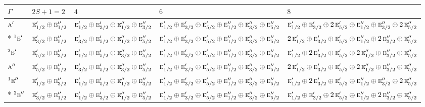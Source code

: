 \documentclass[10pt,a4paper]{article}
\numberwithin{equation}{section}
\newcommand{\irr}[1]{\text{\normalfont\scshape #1}}
\newcommand{\conjpair}[1]{{}^{#1}}
\begin{document}
{\small\setlength{\tabcolsep}{3pt}\begin{longtable}{@{}l>{\RaggedRight\arraybackslash}p{}>{\RaggedRight\arraybackslash}p{}>{\RaggedRight\arraybackslash}p{}>{\RaggedRight\arraybackslash}p{}@{}}\toprule
$\Gamma$ & $2S + 1 = 2$ & $4$ & $6$ & $8$\\\midrule\endhead
\bottomrule\endfoot\endlastfoot
$\irr{a}'$ & $\irr{e}_{1/2}'\oplus \irr{e}_{1/2}''$ & $\irr{e}_{1/2}'\oplus \irr{e}_{3/2}'\oplus \irr{e}_{1/2}''\oplus \irr{e}_{3/2}''$ & $\irr{e}_{1/2}'\oplus \irr{e}_{3/2}'\oplus \irr{e}_{5/2}'\oplus \irr{e}_{1/2}''\oplus \irr{e}_{3/2}''\oplus \irr{e}_{5/2}''$ & $\irr{e}_{1/2}'\oplus \irr{e}_{3/2}'\oplus 2\,\irr{e}_{5/2}'\oplus \irr{e}_{1/2}''\oplus \irr{e}_{3/2}''\oplus 2\,\irr{e}_{5/2}''$\\*
$\conjpair{1}\irr{e}'$ & $\irr{e}_{3/2}'\oplus \irr{e}_{5/2}''$ & $\irr{e}_{3/2}'\oplus \irr{e}_{5/2}'\oplus \irr{e}_{1/2}''\oplus \irr{e}_{5/2}''$ & $\irr{e}_{1/2}'\oplus \irr{e}_{3/2}'\oplus \irr{e}_{5/2}'\oplus \irr{e}_{1/2}''\oplus \irr{e}_{3/2}''\oplus \irr{e}_{5/2}''$ & $2\,\irr{e}_{1/2}'\oplus \irr{e}_{3/2}'\oplus \irr{e}_{5/2}'\oplus \irr{e}_{1/2}''\oplus 2\,\irr{e}_{3/2}''\oplus \irr{e}_{5/2}''$\\
$\conjpair{2}\irr{e}'$ & $\irr{e}_{5/2}'\oplus \irr{e}_{3/2}''$ & $\irr{e}_{1/2}'\oplus \irr{e}_{5/2}'\oplus \irr{e}_{3/2}''\oplus \irr{e}_{5/2}''$ & $\irr{e}_{1/2}'\oplus \irr{e}_{3/2}'\oplus \irr{e}_{5/2}'\oplus \irr{e}_{1/2}''\oplus \irr{e}_{3/2}''\oplus \irr{e}_{5/2}''$ & $\irr{e}_{1/2}'\oplus 2\,\irr{e}_{3/2}'\oplus \irr{e}_{5/2}'\oplus 2\,\irr{e}_{1/2}''\oplus \irr{e}_{3/2}''\oplus \irr{e}_{5/2}''$\\
$\irr{a}''$ & $\irr{e}_{5/2}'\oplus \irr{e}_{5/2}''$ & $\irr{e}_{3/2}'\oplus \irr{e}_{5/2}'\oplus \irr{e}_{3/2}''\oplus \irr{e}_{5/2}''$ & $\irr{e}_{1/2}'\oplus \irr{e}_{3/2}'\oplus \irr{e}_{5/2}'\oplus \irr{e}_{1/2}''\oplus \irr{e}_{3/2}''\oplus \irr{e}_{5/2}''$ & $2\,\irr{e}_{1/2}'\oplus \irr{e}_{3/2}'\oplus \irr{e}_{5/2}'\oplus 2\,\irr{e}_{1/2}''\oplus \irr{e}_{3/2}''\oplus \irr{e}_{5/2}''$\\
$\conjpair{1}\irr{e}''$ & $\irr{e}_{1/2}'\oplus \irr{e}_{3/2}''$ & $\irr{e}_{1/2}'\oplus \irr{e}_{5/2}'\oplus \irr{e}_{1/2}''\oplus \irr{e}_{3/2}''$ & $\irr{e}_{1/2}'\oplus \irr{e}_{3/2}'\oplus \irr{e}_{5/2}'\oplus \irr{e}_{1/2}''\oplus \irr{e}_{3/2}''\oplus \irr{e}_{5/2}''$ & $\irr{e}_{1/2}'\oplus 2\,\irr{e}_{3/2}'\oplus \irr{e}_{5/2}'\oplus \irr{e}_{1/2}''\oplus \irr{e}_{3/2}''\oplus 2\,\irr{e}_{5/2}''$\\*
$\conjpair{2}\irr{e}''$ & $\irr{e}_{3/2}'\oplus \irr{e}_{1/2}''$ & $\irr{e}_{1/2}'\oplus \irr{e}_{3/2}'\oplus \irr{e}_{1/2}''\oplus \irr{e}_{5/2}''$ & $\irr{e}_{1/2}'\oplus \irr{e}_{3/2}'\oplus \irr{e}_{5/2}'\oplus \irr{e}_{1/2}''\oplus \irr{e}_{3/2}''\oplus \irr{e}_{5/2}''$ & $\irr{e}_{1/2}'\oplus \irr{e}_{3/2}'\oplus 2\,\irr{e}_{5/2}'\oplus \irr{e}_{1/2}''\oplus 2\,\irr{e}_{3/2}''\oplus \irr{e}_{5/2}''$\\
\bottomrule\end{longtable}}
\end{document}
